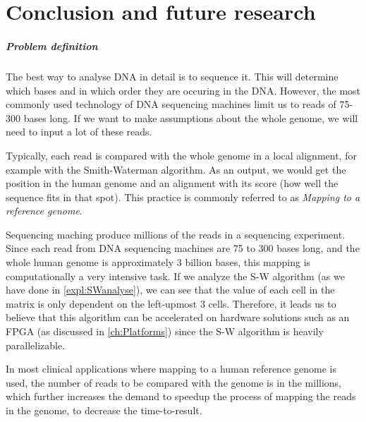 
\chapter{Conclusion and future research}
\label{ch:Conclusions}

\paragraph{Problem definition} 

The best way to analyse DNA in detail is to sequence it. This will determine which bases and in which order they are occuring in the DNA. However, the most commonly used technology of DNA sequencing machines limit us to reads of 75-300 bases long. If we want to make assumptions about the whole genome, we will need to input a lot of these reads. 

Typically, each read is compared with the whole genome in a local alignment, for example with the Smith-Waterman algorithm. As an output, we would get the position in the human genome and an alignment with its score (how well the sequence fits in that spot). This practice is commonly referred to as \emph{Mapping to a reference genome}.

Sequencing maching produce millions of the reads in a sequencing experiment. Since each read from DNA sequencing machines are 75 to 300 bases long, and the whole human genome is approximately 3 billion bases, this mapping is computationally a very intensive task. If we analyze the S-W algorithm (as we have done in \ref{expl:SWanalyse}), we can see that the value of each cell in the matrix is only dependent on the left-upmost 3 cells. Therefore, it leads us to believe that this algorithm can be accelerated on hardware solutions such as an FPGA (as discussed in \ref{ch:Platforms}) since the S-W algorithm is heavily parallelizable.

In most clinical applications where mapping to a human reference genome is used, the number of reads to be compared with the genome is in the millions, which further increases the demand to speedup the process of mapping the reads in the genome, to decrease the time-to-result.

